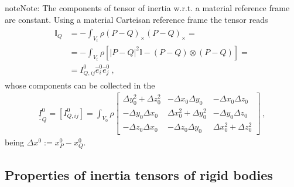 \documentclass[letterpaper,10pt,english]{jupyterBook}
\begin{document}
\begin{sphinxadmonition}{note}{Note:}
\sphinxAtStartPar
The components of tensor of inertia w.r.t. a material reference frame are constant. Using a material Carteisan reference frame the tensor reads
\begin{equation*}
\begin{split}\begin{aligned}
\mathbb{I}_{Q} 
 & = - \int_{V_t} \rho (P - Q)_{\times} (P-Q)_{\times} = \\
 & = - \int_{V_t} \rho \left[ |P-Q|^2 \mathbb{I} - (P-Q) \otimes (P-Q) \right] = \\
 & = I^0_{Q,ij} \hat{e}^0_i \hat{e}^0_j \ ,
\end{aligned}\end{split}
\end{equation*}
\sphinxAtStartPar
whose components can be collected in the 
\begin{equation*}
\begin{split}\underline{\underline{I}}^0_Q = \left[ I^0_{Q,ij} \right] = \int_{V_0} \rho \begin{bmatrix} \Delta y_0^2 + \Delta z_0^2 & -\Delta x_0 \Delta y_0 & -\Delta x_0 \Delta z_0 \\ -\Delta y_0 \Delta x_0 & \Delta x_0^2 + \Delta y_0^2 & -\Delta y_0 \Delta z_0 \\ -\Delta z_0 \Delta x_0 & - \Delta z_0 \Delta y_0 & \Delta x_0^2 + \Delta z_0^2 \end{bmatrix} \ ,\end{split}
\end{equation*}
\sphinxAtStartPar
being \(\Delta x^0 := x^0_P - x_Q^0\).
\end{sphinxadmonition}


\subsection{Properties of inertia tensors of rigid bodies}
\label{\detokenize{ch/inertia:properties-of-inertia-tensors-of-rigid-bodies}}
\end{document}

